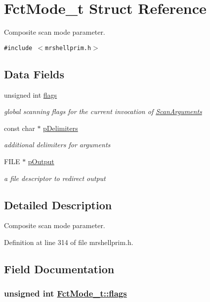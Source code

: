 \hypertarget{structFctMode__t}{
\section{Fct\-Mode\_\-t Struct Reference}
\label{structFctMode__t}
}
Composite scan mode parameter.  


{\tt \#include $<$mrshellprim.h$>$}

\subsection*{Data Fields}
\begin{CompactItemize}
\item 
unsigned int \hyperlink{structFctMode__t_d8c5e03d86fa488caeb6891156875991}{flags}
\begin{CompactList}\small\item\em global scanning flags for the current invocation of \hyperlink{mrshellprim_8h_e2735ecedc52b1199ecf8a208339c072}{Scan\-Arguments} \item\end{CompactList}\item 
const char $\ast$ \hyperlink{structFctMode__t_4b05e60cd819bcb5aa2eb72cf8764659}{p\-Delimiters}
\begin{CompactList}\small\item\em additional delimiters for arguments \item\end{CompactList}\item 
FILE $\ast$ \hyperlink{structFctMode__t_877976072dcbbc142505fb07dcb14673}{p\-Output}
\begin{CompactList}\small\item\em a file descriptor to redirect output \item\end{CompactList}\end{CompactItemize}


\subsection{Detailed Description}
Composite scan mode parameter. 



Definition at line 314 of file mrshellprim.h.

\subsection{Field Documentation}
\hypertarget{structFctMode__t_d8c5e03d86fa488caeb6891156875991}{
\subsubsection[flags]{\setlength{\rightskip}{0pt plus 5cm}unsigned int \hyperlink{structFctMode__t_d8c5e03d86fa488caeb6891156875991}{Fct\-Mode\_\-t::flags}}}
\label{structFctMode__t_d8c5e03d86fa488caeb6891156875991}


